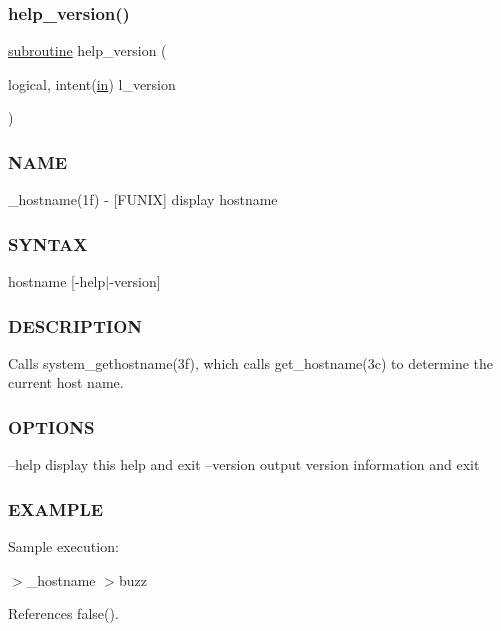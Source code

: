 \subsubsection{\texorpdfstring{help\+\_\+version()}{help\_version()}}
{\footnotesize\ttfamily \hyperlink{M__stopwatch_83_8txt_acfbcff50169d691ff02d4a123ed70482}{subroutine} help\+\_\+version (\begin{DoxyParamCaption}\item[{logical, intent(\hyperlink{M__journal_83_8txt_afce72651d1eed785a2132bee863b2f38}{in})}]{l\+\_\+version }\end{DoxyParamCaption})}



\subsubsection*{N\+A\+ME}

\+\_\+hostname(1f) -\/ \mbox{[}F\+U\+N\+IX\mbox{]} display hostname \subsubsection*{S\+Y\+N\+T\+AX}

hostname \mbox{[}-\/help$\vert$-\/version\mbox{]} \subsubsection*{D\+E\+S\+C\+R\+I\+P\+T\+I\+ON}

Calls system\+\_\+gethostname(3f), which calls get\+\_\+hostname(3c) to determine the current host name. \subsubsection*{O\+P\+T\+I\+O\+NS}

--help display this help and exit --version output version information and exit \subsubsection*{E\+X\+A\+M\+P\+LE}

Sample execution\+:

$>$\+\_\+hostname $>$buzz 

References false().

